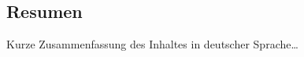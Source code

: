 
\begin{otherlanguage}{spanish}
{}
\chapter*{Resumen}
Kurze Zusammenfassung des Inhaltes in deutscher Sprache\dots
\end{otherlanguage}


\vfill
